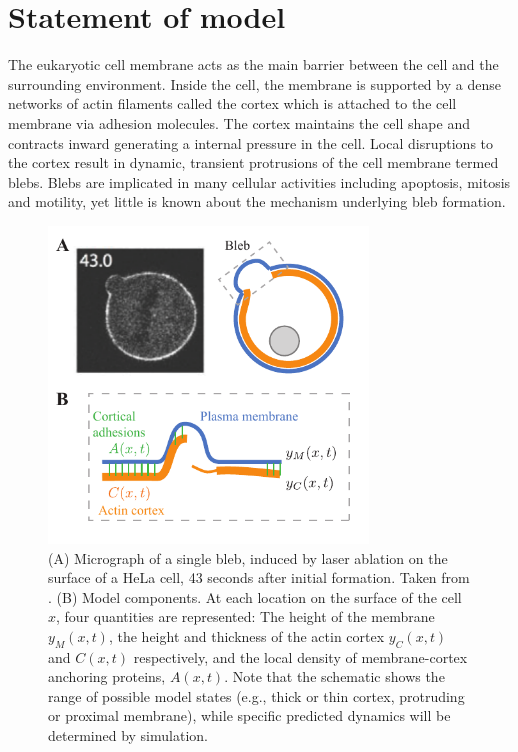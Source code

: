 \section{Statement of model}
The eukaryotic cell membrane acts as the main barrier between the cell and the surrounding environment. Inside the cell, the membrane is supported by a dense networks of actin filaments called the cortex which is attached to the cell membrane via adhesion molecules. The cortex maintains the cell shape and contracts inward generating a internal pressure in the cell. Local disruptions to the cortex result in dynamic, transient protrusions of the cell membrane termed blebs. Blebs are implicated in many cellular activities including apoptosis, mitosis and motility, yet little is known about the mechanism underlying bleb formation.

\begin{figure}
   \begin{center}
	\includegraphics*[width=8.5cm]{figs/figSchematic.pdf}
      \caption{(A) Micrograph of a single bleb, induced by laser ablation on the surface of a HeLa cell, 43 seconds after initial formation. Taken from \cite{Biro:2013bk}. (B) Model components. At each location on the surface of the cell $x$, four quantities are represented: The height of the membrane $y_M(x,t)$, the height and thickness of the actin cortex $y_C(x,t)$ and $C(x,t)$ respectively, and the local density of membrane-cortex anchoring proteins, $A(x,t)$. Note that the schematic shows the range of possible model states (e.g., thick or thin cortex, protruding or proximal membrane), while specific predicted dynamics will be determined by simulation.}
      \label{fig::schematic}
   \end{center}
\end{figure}

